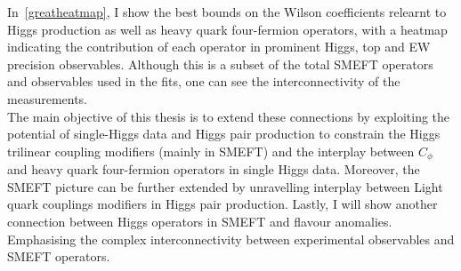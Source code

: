 In~\autoref{greatheatmap}, I show the best bounds on the Wilson coefficients relearnt to Higgs production as well as heavy quark four-fermion operators, with a heatmap indicating the contribution of each operator in prominent Higgs, top and EW precision observables.  Although this is a subset of the total SMEFT operators and observables used in the fits, one can see the interconnectivity of the measurements.\\ The main objective of this thesis is to extend these connections by exploiting the potential of single-Higgs data and Higgs pair production to constrain the Higgs trilinear coupling modifiers (mainly in SMEFT) and the interplay between $C_\phi$ and heavy quark four-fermion operators in single Higgs data. Moreover, the SMEFT picture can be further extended by unravelling interplay between Light quark couplings modifiers in Higgs pair production. Lastly, I will show another connection between Higgs operators in SMEFT and flavour anomalies.  Emphasising the complex interconnectivity between experimental observables and SMEFT operators. 
